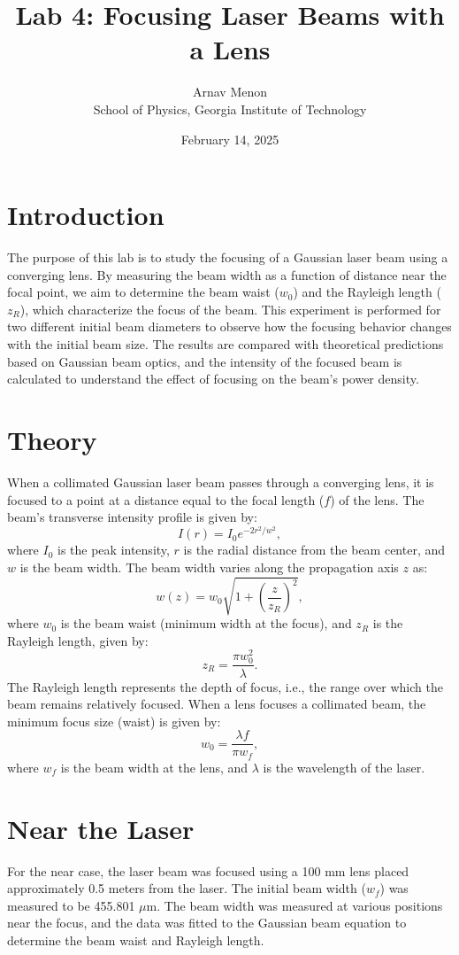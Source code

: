 \documentclass[12pt]{article}
\title{Lab 4: Focusing Laser Beams with a Lens}
\author{Arnav Menon \\ School of Physics, Georgia Institute of Technology}
\date{February 14, 2025}
\begin{document}
\maketitle

\section{Introduction}
The purpose of this lab is to study the focusing of a Gaussian laser beam using a converging lens. By measuring the beam width as a function of distance near the focal point, we aim to determine the beam waist (\(w_0\)) and the Rayleigh length (\(z_R\)), which characterize the focus of the beam. This experiment is performed for two different initial beam diameters to observe how the focusing behavior changes with the initial beam size. The results are compared with theoretical predictions based on Gaussian beam optics, and the intensity of the focused beam is calculated to understand the effect of focusing on the beam's power density.

\section{Theory}
When a collimated Gaussian laser beam passes through a converging lens, it is focused to a point at a distance equal to the focal length (\(f\)) of the lens. The beam's transverse intensity profile is given by:
\[
I(r) = I_0 e^{-2r^2 / w^2},
\]
where \(I_0\) is the peak intensity, \(r\) is the radial distance from the beam center, and \(w\) is the beam width. The beam width varies along the propagation axis \(z\) as:
\[
w(z) = w_0 \sqrt{1 + \left(\frac{z}{z_R}\right)^2},
\]
where \(w_0\) is the beam waist (minimum width at the focus), and \(z_R\) is the Rayleigh length, given by:
\[
z_R = \frac{\pi w_0^2}{\lambda}.
\]
The Rayleigh length represents the depth of focus, i.e., the range over which the beam remains relatively focused. When a lens focuses a collimated beam, the minimum focus size (waist) is given by:
\[
w_0 = \frac{\lambda f}{\pi w_f},
\]
where \(w_f\) is the beam width at the lens, and \(\lambda\) is the wavelength of the laser.

\section{Near the Laser}
For the near case, the laser beam was focused using a 100 mm lens placed approximately 0.5 meters from the laser. The initial beam width (\(w_f\)) was measured to be 455.801 \(\mu\)m. The beam width was measured at various positions near the focus, and the data was fitted to the Gaussian beam equation to determine the beam waist and Rayleigh length.
\end{document}
